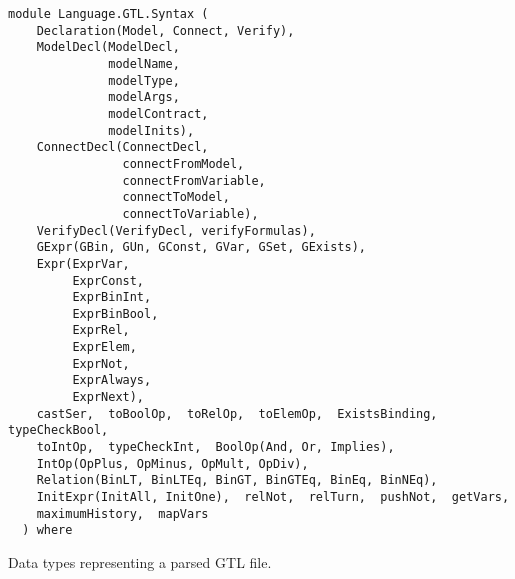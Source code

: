 \label{module:Language.GTL.Syntax}
\haddockbeginheader
{\haddockverb\begin{verbatim}
module Language.GTL.Syntax (
    Declaration(Model, Connect, Verify), 
    ModelDecl(ModelDecl,
              modelName,
              modelType,
              modelArgs,
              modelContract,
              modelInits), 
    ConnectDecl(ConnectDecl,
                connectFromModel,
                connectFromVariable,
                connectToModel,
                connectToVariable), 
    VerifyDecl(VerifyDecl, verifyFormulas), 
    GExpr(GBin, GUn, GConst, GVar, GSet, GExists), 
    Expr(ExprVar,
         ExprConst,
         ExprBinInt,
         ExprBinBool,
         ExprRel,
         ExprElem,
         ExprNot,
         ExprAlways,
         ExprNext), 
    castSer,  toBoolOp,  toRelOp,  toElemOp,  ExistsBinding,  typeCheckBool, 
    toIntOp,  typeCheckInt,  BoolOp(And, Or, Implies), 
    IntOp(OpPlus, OpMinus, OpMult, OpDiv), 
    Relation(BinLT, BinLTEq, BinGT, BinGTEq, BinEq, BinNEq), 
    InitExpr(InitAll, InitOne),  relNot,  relTurn,  pushNot,  getVars, 
    maximumHistory,  mapVars
  ) where\end{verbatim}}
\haddockendheader

Data types representing a parsed GTL file.
\par

